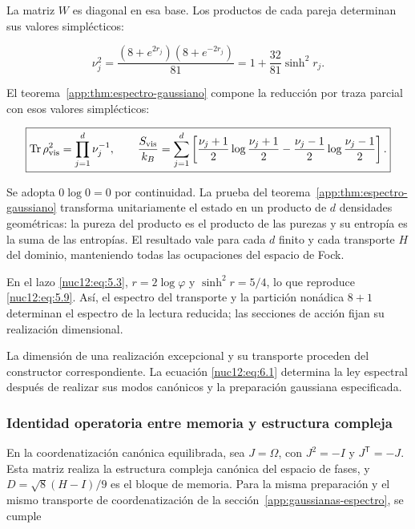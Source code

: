 La matriz \(W\) es diagonal en esa base. Los productos de cada pareja determinan sus valores simplécticos:



\begin{equation}
\boxed{\nu_j^2=
\frac{(8+e^{2r_j})(8+e^{-2r_j})}{81}
=1+\frac{32}{81}\sinh^2r_j.}
\label{nuc12:eq:6.1}
\end{equation}



El teorema~\ref{app:thm:espectro-gaussiano} compone la reducción por traza parcial con esos valores simplécticos:



\begin{equation}
\boxed{\operatorname{Tr}\rho_{\rm vis}^2=\prod_{j=1}^d\nu_j^{-1},
\qquad
\frac{S_{\rm vis}}{k_B}=\sum_{j=1}^d
\left[\frac{\nu_j+1}{2}\log\frac{\nu_j+1}{2}
-\frac{\nu_j-1}{2}\log\frac{\nu_j-1}{2}\right].}
\label{nuc12:eq:6.2}
\end{equation}



Se adopta \(0\log0=0\) por continuidad. La prueba del teorema~\ref{app:thm:espectro-gaussiano} transforma unitariamente el estado en un producto de \(d\) densidades geométricas: la pureza del producto es el producto de las purezas y su entropía es la suma de las entropías. El resultado vale para cada \(d\) finito y cada transporte \(H\) del dominio, manteniendo todas las ocupaciones del espacio de Fock.

En el lazo \eqref{nuc12:eq:5.3}, \(r=2\log\varphi\) y \(\sinh^2r=5/4\), lo que reproduce \eqref{nuc12:eq:5.9}. Así, el espectro del transporte y la partición nonádica \(8+1\) determinan el espectro de la lectura reducida; las secciones de acción fijan su realización dimensional.

La dimensión de una realización excepcional y su transporte proceden del constructor correspondiente. La ecuación \eqref{nuc12:eq:6.1} determina la ley espectral después de realizar sus modos canónicos y la preparación gaussiana especificada.

\subsubsection{Identidad operatoria entre memoria y estructura compleja}

En la coordenatización canónica equilibrada, sea \(J=\Omega\), con \(J^2=-I\) y \(J^{\mathsf T}=-J\). Esta matriz realiza la estructura compleja canónica del espacio de fases, y \(D=\sqrt8(H-I)/9\) es el bloque de memoria. Para la misma preparación y el mismo transporte de coordenatización de la sección~\ref{app:gaussianas-espectro}, se cumple



